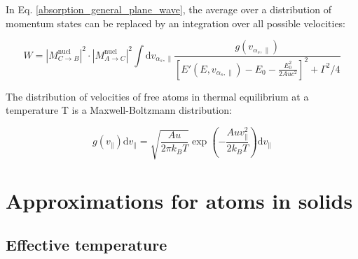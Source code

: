 \documentclass{article}
\begin{document}
In Eq. \ref{absorption_general_plane_wave}, the average over a distribution of momentum states can be replaced by an integration over all possible velocities:

\begin{equation}
\label{absorption_plane_wave_v}
	W = \left| M^{\mathrm{nucl}}_{C \to B} \right|^2 \cdot \left| M^{\mathrm{nucl}}_{A \to C} \right|^2 \int \mathrm{d} v_{\alpha_s, \parallel}  \frac{g(v_{\alpha_s, \parallel})}{ \left[ E' (E, v_{\alpha_s, \parallel})- E_0 - \frac{E_0^2}{2 Auc^2} \right]^2 + \Gamma^2 / 4}
\end{equation}

The distribution of velocities of free atoms in thermal equilibrium at a temperature T is a Maxwell-Boltzmann distribution:

\begin{equation}
	\label{maxwell_boltzmann_distribution}
	g(v_\parallel) \mathrm{d} v_\parallel = \sqrt{\frac{A u}{2 \pi k_B T}} \exp{\left( - \frac{A u v_\parallel^2}{2 k_B T} \right)} \mathrm{d} v_\parallel
\end{equation}

\section{Approximations for atoms in solids}

\subsection{Effective temperature}




\end{document}
